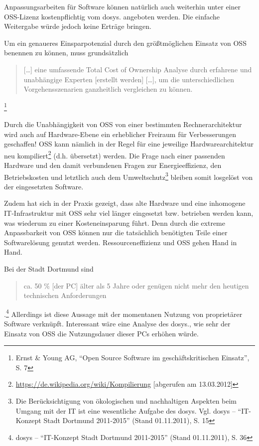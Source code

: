 \documentclass[a4paper]{scrartcl}
\begin{document}
Anpassungsarbeiten für Software können natürlich auch weiterhin unter einer
OSS-Lizenz kostenpflichtig vom dosys. angeboten werden. Die einfache Weitergabe
würde jedoch keine Erträge bringen.

Um ein genaueres Einsparpotenzial durch den größtmöglichen Einsatz von OSS
benennen zu können, muss grundsätzlich
\begin{quote} [\ldots] eine umfassende Total Cost of Ownership Analyse durch
  erfahrene und unabhängige Experten [erstellt werden] [\ldots], um die
  unterschiedlichen Vorgehensszenarien ganzheitlich vergleichen zu
  können.\end{quote}\footnote{Ernst \& Young AG, ``Open Source Software im
  geschäftskritischen Einsatz'', S. 7}

Durch die Unabhängigkeit von OSS von einer bestimmten Rechnerarchitektur wird
auch auf Hardware-Ebene ein erheblicher Freiraum für Verbesserungen geschaffen!
OSS kann nämlich in der Regel für eine jeweilige Hardwarearchitektur neu
kompiliert\footnote{\url{https://de.wikipedia.org/wiki/Kompilierung} [abgerufen
  am 13.03.2012]} (d.h. übersetzt) werden. Die Frage nach einer passenden
Hardware und den damit verbundenen Fragen zur Energieeffizienz, den
Betriebskosten und letztlich auch dem Umweltschutz\footnote{Die Berücksichtigung
  von ökologischen und nachhaltigen Aspekten beim Umgang mit der IT ist eine
  wesentliche Aufgabe des dosys. Vgl. dosys -- ``IT-Konzept Stadt Dortmund
  2011-2015'' (Stand 01.11.2011), S. 15} bleiben somit losgelöst von der
eingesetzten Software.

Zudem hat sich in der Praxis gezeigt, dass alte Hardware und eine inhomogene
IT-Infrastruktur mit OSS sehr viel länger eingesetzt bzw.  betrieben werden
kann, was wiederum zu einer Kosteneinsparung führt.  Denn durch die extreme
Anpassbarkeit von OSS können nur die tatsächlich benötigten Teile einer
Softwarelösung genutzt werden.  Ressourceneffizienz und OSS gehen Hand in Hand.

Bei der Stadt Dortmund sind \begin{quote}ca. 50 \% [der PC] älter als 5 Jahre
  oder genügen nicht mehr den heutigen technischen
  Anforderungen\end{quote}.\footnote{dosys -- ``IT-Konzept Stadt Dortmund
  2011-2015'' (Stand 01.11.2011), S. 36} Allerdings ist diese Aussage mit der
momentanen Nutzung von proprietärer Software verknüpft. Interessant wäre eine
Analyse des dosys., wie sehr der Einsatz von OSS die Nutzungsdauer dieser PCs
erhöhen würde.
\end{document}
